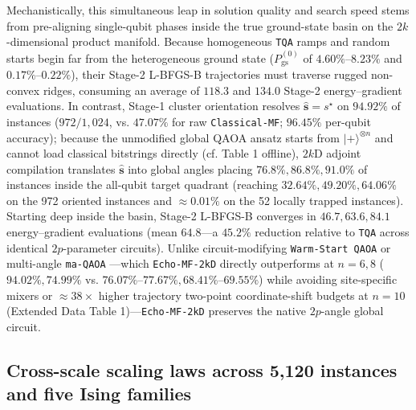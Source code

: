 \documentclass[10pt,a4paper]{article}
\begin{document}
Mechanistically, this simultaneous leap in solution quality and search speed stems from pre-aligning single-qubit phases inside the true ground-state basin on the $2k$-dimensional product manifold. Because homogeneous \texttt{TQA} ramps and random starts begin far from the heterogeneous ground state ($P_{\mathrm{gs}}^{(0)}$ of $4.60\%\mbox{--}8.23\%$ and $0.17\%\mbox{--}0.22\%$), their Stage-2 L-BFGS-B trajectories must traverse rugged non-convex ridges, consuming an average of $118.3$ and $134.0$ Stage-2 energy--gradient evaluations. In contrast, Stage-1 cluster orientation resolves $\hat{\boldsymbol{s}} = s^\star$ on $94.92\%$ of instances ($972/1{,}024$, vs. $47.07\%$ for raw \texttt{Classical-MF}; $96.45\%$ per-qubit accuracy); because the unmodified global QAOA ansatz starts from $|+\rangle^{\otimes n}$ and cannot load classical bitstrings directly (cf. Table 1 offline), $2k$D adjoint compilation translates $\hat{\boldsymbol{s}}$ into global angles placing $76.8\%, 86.8\%, 91.0\%$ of instances inside the all-qubit target quadrant (reaching $32.64\%, 49.20\%, 64.06\%$ on the 972 oriented instances and $\approx 0.01\%$ on the 52 locally trapped instances). Starting deep inside the basin, Stage-2 L-BFGS-B converges in $\mathbf{46.7, 63.6, 84.1}$ energy--gradient evaluations (mean $\mathbf{64.8}$---a $\mathbf{45.2}\%$ reduction relative to \texttt{TQA} across identical $2p$-parameter circuits). Unlike circuit-modifying \texttt{Warm-Start QAOA} \citep{egger2021warm,tate2023warm} or multi-angle \texttt{ma-QAOA} \citep{herrman2022multi}---which \texttt{Echo-MF-2kD} directly outperforms at $n=6, 8$ ($94.02\%, 74.99\%$ vs. $76.07\%\mbox{--}77.67\%, 68.41\%\mbox{--}69.55\%$) while avoiding site-specific mixers or $\approx 38\times$ higher trajectory two-point coordinate-shift budgets at $n=10$ (Extended Data Table 1)---\texttt{Echo-MF-2kD} preserves the native $2p$-angle global circuit.


\subsection*{Cross-scale scaling laws across 5,120 instances and five Ising families}
\end{document}
